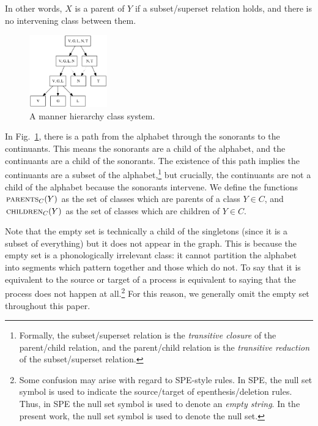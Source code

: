\documentclass[12pt, oneside]{article}   	%
\begin{document}
\vspace{\baselineskip} \noindent In other words, $X$ is a parent of $Y$ if a subset/superset relation holds, and there is no intervening class between them.

\begin{figure}[htb!]
	\centering
	\includegraphics[width=0.3\textwidth]{manner_poset_privative.png}
	\caption{A manner hierarchy class system.}
	\label{fig:manner_input}
\end{figure}

In Fig.~\ref{fig:manner_input}, there is a path from the alphabet through the sonorants to the continuants. This means the sonorants are a child of the alphabet, and the continuants are a child of the sonorants. The existence of this path implies the continuants are a subset of the alphabet,\footnote{Formally, the subset/superset relation is the \textit{transitive closure} of the parent/child relation, and the parent/child relation is the \textit{transitive reduction} of the subset/superset relation.} but crucially, the continuants are not a child of the alphabet because the sonorants intervene. We  define the functions $\textsc{parents}_C(Y)$ as the set of classes which are parents of a class $Y \in C$, and $\textsc{children}_C(Y)$ as the set of classes which are children of $Y \in C$.

Note that the empty set is technically a child of the singletons (since it is a subset of everything) but it does not appear in the graph. This is because the empty set is a phonologically irrelevant class: it cannot partition the alphabet into segments which pattern together and those which do not. To say that it is equivalent to the source or target of a process is equivalent to saying that the process does not happen at all.\footnote{Some confusion may arise with regard to SPE-style rules. In SPE, the null set symbol is used to indicate the source/target of epenthesis/deletion rules. Thus, in SPE the null set symbol is used to denote an \emph{empty string}. In the present work, the null set symbol is used to denote the null set.} For this reason, we generally omit the empty set throughout this paper.
\end{document}
